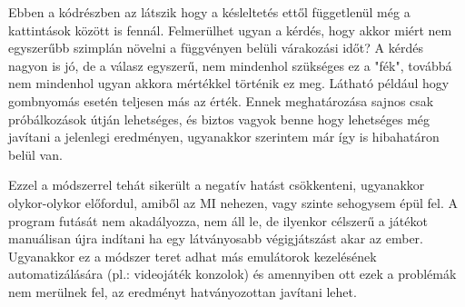 Ebben a kódrészben az látszik hogy a késleltetés ettől függetlenül még a kattintások között is fennál. Felmerülhet ugyan a kérdés, hogy akkor miért nem egyszerűbb szimplán növelni a függvényen belüli várakozási időt? A kérdés nagyon is jó, de a válasz egyszerű, nem mindenhol szükséges ez a "fék", továbbá nem mindenhol ugyan akkora mértékkel történik ez meg. Látható például hogy gombnyomás esetén teljesen más az érték. Ennek meghatározása sajnos csak próbálkozások útján lehetséges, és biztos vagyok benne hogy lehetséges még javítani a jelenlegi eredményen, ugyanakkor szerintem már így is hibahatáron belül van.

Ezzel a módszerrel tehát sikerült a negatív hatást csökkenteni, ugyanakkor olykor-olykor előfordul, amiből az MI nehezen, vagy szinte sehogysem épül fel. A program futását nem akadályozza, nem áll le, de ilyenkor célszerű a játékot manuálisan újra indítani ha egy látványosabb végigjátszást akar az ember. Ugyanakkor ez a módszer teret adhat más emulátorok kezelésének automatizálására (pl.: videojáték konzolok) és amennyiben ott ezek a problémák nem merülnek fel, az eredményt hatványozottan javítani lehet.
